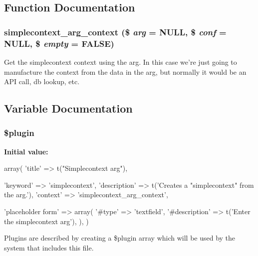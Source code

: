 \subsection{Function Documentation}
\hypertarget{simplecontext__arg_8inc_a4c6318fc0e6cfeb71d9a689daf023b47}{
\subsubsection[{simplecontext\_\-arg\_\-context}]{\setlength{\rightskip}{0pt plus 5cm}simplecontext\_\-arg\_\-context (\$ {\em arg} = {\ttfamily NULL}, \/  \$ {\em conf} = {\ttfamily NULL}, \/  \$ {\em empty} = {\ttfamily FALSE})}}
\label{simplecontext__arg_8inc_a4c6318fc0e6cfeb71d9a689daf023b47}
Get the simplecontext context using the arg. In this case we're just going to manufacture the context from the data in the arg, but normally it would be an API call, db lookup, etc. 

\subsection{Variable Documentation}
\hypertarget{simplecontext__arg_8inc_ada8a7130088351710bb02ed622d6bf65}{
\subsubsection[{\$plugin}]{\setlength{\rightskip}{0pt plus 5cm}\$plugin}}
\label{simplecontext__arg_8inc_ada8a7130088351710bb02ed622d6bf65}
{\bfseries Initial value:}
\begin{DoxyCode}
 array(
  'title' => t("Simplecontext arg"),
  
  'keyword' => 'simplecontext',
  'description' => t('Creates a "simplecontext" from the arg.'),
  'context' => 'simplecontext_arg_context',
  

  
  
  'placeholder form' => array(
    '#type' => 'textfield',
    '#description' => t('Enter the simplecontext arg'),
  ),
)
\end{DoxyCode}
Plugins are described by creating a \$plugin array which will be used by the system that includes this file. 